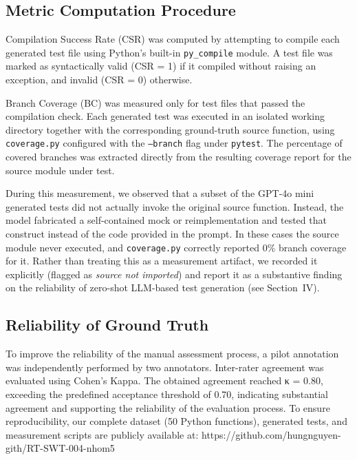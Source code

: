 \documentclass[conference]{IEEEtran}
\begin{document}
\subsection{Metric Computation Procedure}
Compilation Success Rate (CSR) was computed by attempting to compile each
generated test file using Python's built-in \texttt{py\_compile} module. A
test file was marked as syntactically valid (CSR = 1) if it compiled
without raising an exception, and invalid (CSR = 0) otherwise.

Branch Coverage (BC) was measured only for test files that passed the
compilation check. Each generated test was executed in an isolated working
directory together with the corresponding ground-truth source function,
using \texttt{coverage.py} configured with the \texttt{--branch} flag under
\texttt{pytest}. The percentage of covered branches was extracted directly
from the resulting coverage report for the source module under test.

During this measurement, we observed that a subset of the GPT-4o mini
generated tests did not actually invoke the original source function.
Instead, the model fabricated a self-contained mock or reimplementation
and tested that construct instead of the code provided in the prompt. In
these cases the source module never executed, and \texttt{coverage.py}
correctly reported 0\% branch coverage for it. Rather than treating this
as a measurement artifact, we recorded it explicitly (flagged as
\textit{source not imported}) and report it as a substantive finding on
the reliability of zero-shot LLM-based test generation (see Section~IV).
\subsection{Reliability of Ground Truth}\label{SCM}
To improve the reliability of the manual assessment process, a pilot annotation was independently performed by two annotators. Inter-rater agreement was evaluated using Cohen's Kappa. The obtained agreement reached κ = 0.80, exceeding the predefined acceptance threshold of 0.70, indicating substantial agreement and supporting the reliability of the evaluation process.
To ensure reproducibility, our complete dataset (50 Python functions), generated tests, and measurement scripts are publicly available at: https://github.com/hungnguyen-gith/RT-SWT-004-nhom5
\end{document}
